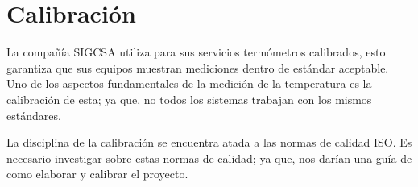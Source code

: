 \section{Calibración}

\par
La compañía SIGCSA utiliza para sus servicios termómetros calibrados, esto garantiza que sus equipos muestran mediciones dentro de estándar aceptable. Uno de los aspectos fundamentales de la medición de la temperatura es la calibración de esta; ya que, no todos los sistemas trabajan con los mismos estándares. 





\par \noindent
La disciplina de la calibración se encuentra atada a las normas de calidad ISO. Es necesario investigar sobre estas normas de calidad; ya que, nos darían una guía de como elaborar y calibrar el proyecto.
